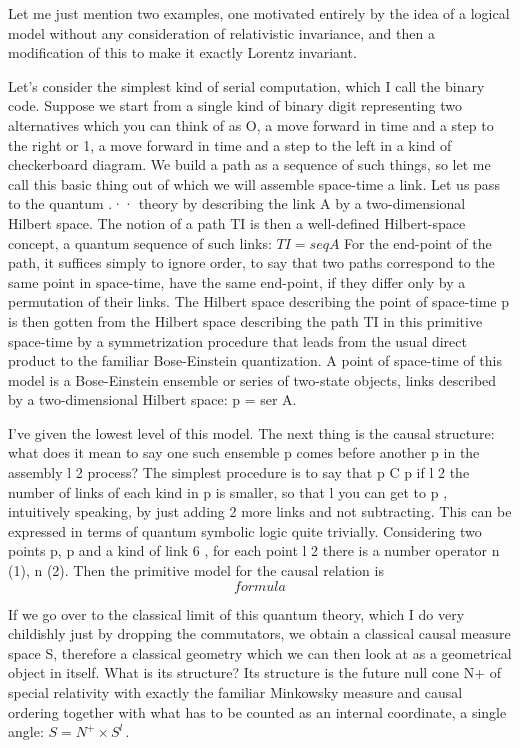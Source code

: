 Let me just mention two examples, one motivated entirely by the idea of a logical
model without any consideration of relativistic invariance, and then a
modification of this to make it exactly Lorentz invariant.

Let's consider the simplest kind of serial computation, which I call the binary
code. Suppose we start from a single kind of binary digit representing two
alternatives which you can think of as O, a move forward in time and a step to
the right or 1, a move forward in time and a step to the left in a kind of
checkerboard diagram. We build a path as a sequence of such things, so let me
call this basic thing out of which we will assemble space-time a link. Let us
pass to the quantum .·· theory by describing the link A by a two-dimensional
Hilbert space. The notion of a path TI is then a well-defined Hilbert-space
concept, a quantum sequence of such links: $TI= seq A$ For the end-point of the
path, it suffices simply to ignore order, to say that two paths correspond to the
same point in space-time, have the same end-point, if they differ only by a
permutation of their links. The Hilbert space describing the point of space-time
p is then gotten from the Hilbert space describing the path TI in this primitive
space-time by a symmetrization procedure that leads from the usual direct product
to the familiar Bose-Einstein quantization. A point of space-time of this model
is a Bose-Einstein ensemble or series of two-state objects, links described by a
two-dimensional Hilbert space: p = ser A.

I've given the lowest level of this model. The next thing is the causal structure: what does it mean to say one such ensemble p comes before another p in the assembly
l 2
process? The simplest procedure is to say that p C p if
l 2
the number of links of each kind in p is smaller, so that
l
you can get to p , intuitively speaking, by just adding
2
more links and not subtracting. This can be expressed in
terms of quantum symbolic logic quite trivially. Considering
two points p, p and a kind of link 6 , for each point
l 2
there is a number operator n (1), n (2). Then the primitive
model for the causal relation is
\[formula\]

If we go over to the classical limit of this quantum theory, which I do very
childishly just by dropping the commutators, we obtain a classical causal measure
space S, therefore a classical geometry which we can then look at as a
geometrical object in itself. What is its structure? Its structure is the future
null cone N+ of special relativity with exactly the familiar Minkowsky measure
and causal ordering together with what has to be counted as an internal
coordinate, a single angle:
\(
S=N^+ \times S^l
\,.
\)

